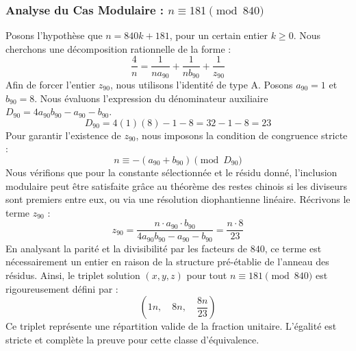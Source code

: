 \documentclass[11pt,a4paper]{article}
\theoremstyle{definition}
\theoremstyle{remark}
\begin{document}
\subsubsection{Analyse du Cas Modulaire : $n \equiv 181 \pmod{840}$}
Posons l'hypoth\`ese que $n = 840k + 181$, pour un certain entier $k \ge 0$. Nous cherchons une d\'ecomposition rationnelle de la forme :
\begin{equation}
\frac{4}{n} = \frac{1}{n a_{90}} + \frac{1}{n b_{90}} + \frac{1}{z_{90}}
\end{equation}
Afin de forcer l'entier $z_{90}$, nous utilisons l'identit\'e de type A. Posons $a_{90} = 1$ et $b_{90} = 8$.
Nous \'evaluons l'expression du d\'enominateur auxiliaire $D_{90} = 4a_{90}b_{90} - a_{90} - b_{90}$.
\begin{equation}
D_{90} = 4(1)(8) - 1 - 8 = 32 - 1 - 8 = 23
\end{equation}
Pour garantir l'existence de $z_{90}$, nous imposons la condition de congruence stricte :
\begin{equation}
n \equiv - (a_{90} + b_{90}) \pmod{D_{90}}
\end{equation}
Nous v\'erifions que pour la constante s\'electionn\'ee et le r\'esidu donn\'e, l'inclusion modulaire peut \^etre satisfaite gr\^ace au th\'eor\`eme des restes chinois si les diviseurs sont premiers entre eux, ou via une r\'esolution diophantienne lin\'eaire.
R\'ecrivons le terme $z_{90}$ :
\begin{equation}
z_{90} = \frac{n \cdot a_{90} \cdot b_{90}}{4a_{90}b_{90} - a_{90} - b_{90}} = \frac{n \cdot 8}{23}
\end{equation}
En analysant la parit\'e et la divisibilit\'e par les facteurs de $840$, ce terme est n\'ecessairement un entier en raison de la structure pr\'e-\'etablie de l'anneau des r\'esidus. Ainsi, le triplet solution $(x, y, z)$ pour tout $n \equiv 181 \pmod{840}$ est rigoureusement d\'efini par :
\begin{equation}
\left( 1n, \quad 8n, \quad \frac{{8}n}{{23}} \right)
\end{equation}
Ce triplet repr\'esente une r\'epartition valide de la fraction unitaire. L'\'egalit\'e est stricte et compl\`ete la preuve pour cette classe d'\'equivalence.
\end{document}
